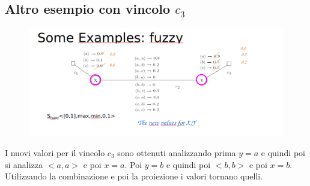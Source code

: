 \subsection{Altro esempio con vincolo \texorpdfstring{$c_3$}{c3}}
\begin{figure}[htp]
    \centering
    \includegraphics[width=14cm, keepaspectratio]{img/Cap5/FUZZY2.png}
\end{figure}
I nuovi valori per il vincolo $c_3$ sono ottenuti analizzando prima $y = a$ e
quindi poi si analizza $<a, a>$ e poi $x = a$. Poi $y = b$ e quindi poi $<b, b>$ e
poi $x = b$. Utilizzando la combinazione e poi la proiezione i valori tornano
quelli.
